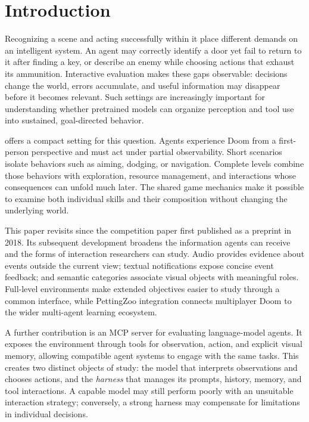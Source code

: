 \section{Introduction}
Recognizing a scene and acting successfully within it place different demands on an intelligent system. An agent may correctly identify a door yet fail to return to it after finding a key, or describe an enemy while choosing actions that exhaust its ammunition. Interactive evaluation makes these gaps observable: decisions change the world, errors accumulate, and useful information may disappear before it becomes relevant. Such settings are increasingly important for understanding whether pretrained models can organize perception and tool use into sustained, goal-directed behavior.

\vzd{} offers a compact setting for this question. Agents experience Doom from a first-person perspective and must act under partial observability. Short scenarios isolate behaviors such as aiming, dodging, or navigation. Complete levels combine those behaviors with exploration, resource management, and interactions whose consequences can unfold much later. The shared game mechanics make it possible to examine both individual skills and their composition without changing the underlying world.

This paper revisits \vzd{} since the competition paper first published as a preprint in 2018. Its subsequent development broadens the information agents can receive and the forms of interaction researchers can study. Audio provides evidence about events outside the current view; textual notifications expose concise event feedback; and semantic categories associate visual objects with meaningful roles. Full-level environments make extended objectives easier to study through a common interface, while PettingZoo integration connects multiplayer Doom to the wider multi-agent learning ecosystem.

A further contribution is an MCP server for evaluating language-model agents. It exposes the environment through tools for observation, action, and explicit visual memory, allowing compatible agent systems to engage with the same tasks. This creates two distinct objects of study: the model that interprets observations and chooses actions, and the \emph{harness} that manages its prompts, history, memory, and tool interactions. A capable model may still perform poorly with an unsuitable interaction strategy; conversely, a strong harness may compensate for limitations in individual decisions.

